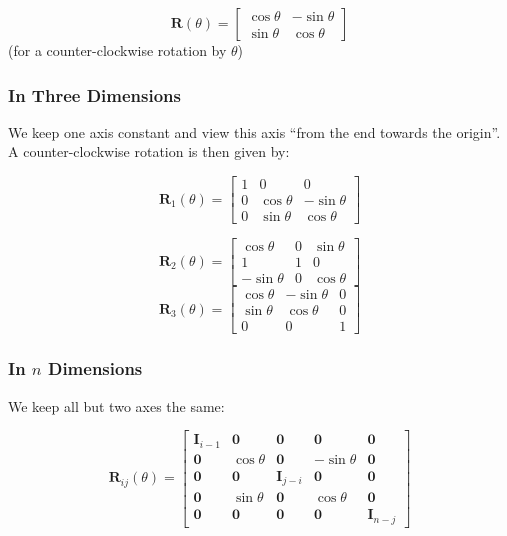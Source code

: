 \documentclass[10pt,twoside,twocolumn]{article}
\begin{document}
\[
\mathbf{R}\left(\theta\right)=\left[\begin{array}{cc}
\cos\theta & -\sin\theta\\
\sin\theta & \cos\theta
\end{array}\right]
\]
(for a counter-clockwise rotation by $\theta$)


\subsubsection{In Three Dimensions}

We keep one axis constant and view this axis ``from the end towards
the origin''. A counter-clockwise rotation is then given by:

\[
\mathbf{R}_{1}\left(\theta\right)=\left[\begin{array}{ccc}
1 & 0 & 0\\
0 & \cos\theta & -\sin\theta\\
0 & \sin\theta & \cos\theta
\end{array}\right]
\]


\[
\mathbf{R}_{2}\left(\theta\right)=\left[\begin{array}{ccc}
\cos\theta & 0 & \sin\theta\\
1 & 1 & 0\\
-\sin\theta & 0 & \cos\theta
\end{array}\right]
\]
\[
\mathbf{R}_{3}\left(\theta\right)=\left[\begin{array}{ccc}
\cos\theta & -\sin\theta & 0\\
\sin\theta & \cos\theta & 0\\
0 & 0 & 1
\end{array}\right]
\]



\subsubsection{In $n$ Dimensions}

We keep all but two axes the same:

\[
\mathbf{R}_{ij}\left(\theta\right)=\left[\begin{array}{ccccc}
\mathbf{I}_{i-1} & \mathbf{0} & \mathbf{0} & \mathbf{0} & \mathbf{0}\\
\mathbf{0} & \cos\theta & \mathbf{0} & -\sin\theta & \mathbf{0}\\
\mathbf{0} & \mathbf{0} & \mathbf{I}_{j-i} & \mathbf{0} & \mathbf{0}\\
\mathbf{0} & \sin\theta & \mathbf{0} & \cos\theta & \mathbf{0}\\
\mathbf{0} & \mathbf{0} & \mathbf{0} & \mathbf{0} & \mathbf{I}_{n-j}
\end{array}\right]
\]
\end{document}
